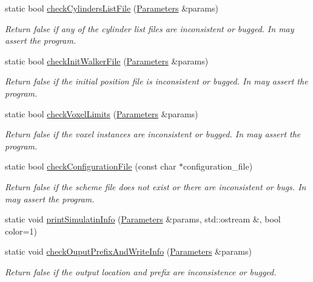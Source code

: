 \begin{DoxyCompactItemize}
static bool \hyperlink{class_sim_errno_a077a20f0886022c924911e24fbc91b52}{check\+Cylinders\+List\+File} (\hyperlink{class_parameters}{Parameters} \&params)
\begin{DoxyCompactList}\small\item\em Return false if any of the cylinder list files are inconsistent or bugged. In may assert the program. \end{DoxyCompactList}\item 
static bool \hyperlink{class_sim_errno_a21ed929e9b81e9059d4da3ca03c9d80c}{check\+Init\+Walker\+File} (\hyperlink{class_parameters}{Parameters} \&params)
\begin{DoxyCompactList}\small\item\em Return false if the initial position file is inconsistent or bugged. In may assert the program. \end{DoxyCompactList}\item 
static bool \hyperlink{class_sim_errno_a9b9712b12322cdd0667d6fc4ee7aceaf}{check\+Voxel\+Limits} (\hyperlink{class_parameters}{Parameters} \&params)
\begin{DoxyCompactList}\small\item\em Return false if the voxel instances are inconsistent or bugged. In may assert the program. \end{DoxyCompactList}\item 
static bool \hyperlink{class_sim_errno_a4b59c263ba564ebc9edbd40fe9ec3bc8}{check\+Configuration\+File} (const char $\ast$configuration\+\_\+file)
\begin{DoxyCompactList}\small\item\em Return false if the scheme file does not exist or there are inconsistent or bugs. In may assert the program. \end{DoxyCompactList}\item 
static void \hyperlink{class_sim_errno_a87782efbd7825d733d3f0c760cf47222}{print\+Simulatin\+Info} (\hyperlink{class_parameters}{Parameters} \&params, std\+::ostream \&, bool color=1)
\item 
static void \hyperlink{class_sim_errno_a195d934b873f7b10be5f57cf6f77e80f}{check\+Ouput\+Prefix\+And\+Write\+Info} (\hyperlink{class_parameters}{Parameters} \&params)
\begin{DoxyCompactList}\small\item\em Return false if the output location and prefix are inconsistence or bugged. \end{DoxyCompactList}\item 

\end{DoxyCompactItemize}
